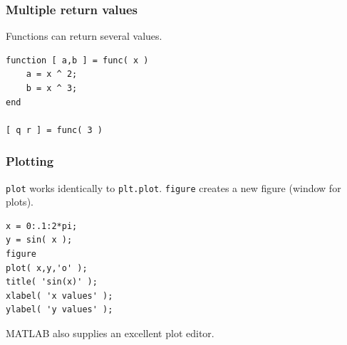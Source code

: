 \documentclass[11pt]{beamer}
\begin{document}
\begin{frame}[fragile]
  \frametitle{Multiple return values}
  \Enlarge

  \begin{enumerate}
  \myitem  Functions can return several values. 
  \end{enumerate}
  \begin{Verbatim}
function [ a,b ] = func( x )
    a = x ^ 2;
    b = x ^ 3;
end

[ q r ] = func( 3 )
  \end{Verbatim}
\end{frame}



\iffalse
\begin{frame}[fragile]
  \frametitle{Plotting}
  \Enlarge

  \begin{enumerate}
  \myitem  \texttt{plot} works identically to \texttt{plt.plot}.  \pause
  \myitem  \texttt{figure} creates a new figure (window for plots).  \pause
  \end{enumerate}
  \begin{Verbatim}
x = 0:.1:2*pi;
y = sin( x );
figure
plot( x,y,'o' );
title( 'sin(x)' );
xlabel( 'x values' );
ylabel( 'y values' );
  \end{Verbatim}
  \pause
  \begin{enumerate}
  \myitem  MATLAB also supplies an excellent plot editor.
  \end{enumerate}
\end{frame}
\end{document}

